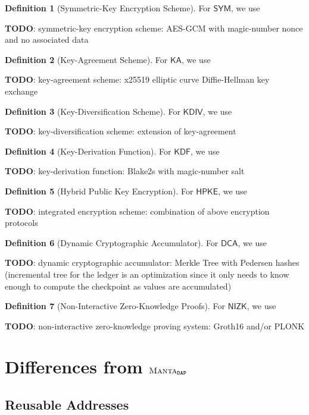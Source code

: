 \documentclass[a4paper]{article}
\newcommand{\lsection}[2]{\def\sectionlabel{#2} \section{#1}\label{sec:#2}}
\newcommand{\TODO}[1]{{\color{red}\textbf{TODO}}: #1}
\theoremstyle{definition}
\newtheorem{definition}{Definition}[subsection]
\newcommand{\DCA}{{\textsf{DCA}}}
\newcommand{\HPKE}{{\textsf{HPKE}}}
\newcommand{\KA}{{\textsf{KA}}}
\newcommand{\KDF}{{\textsf{KDF}}}
\newcommand{\KDIV}{{\textsf{KDIV}}}
\newcommand{\MantaDAP}{{\Manta{}_{\texttt{DAP}}}}
\newcommand{\Manta}{{\textsc{Manta}}}
\newcommand{\NIZK}{{\textsf{NIZK}}}
\newcommand{\SYM}{{\textsf{SYM}}}
\begin{document}
\begin{definition}[Symmetric-Key Encryption Scheme]
    For $\SYM$, we use

    \TODO{symmetric-key encryption scheme: AES-GCM with magic-number nonce and no associated data}
\end{definition}

\begin{definition}[Key-Agreement Scheme]
    For $\KA$, we use

    \TODO{key-agreement scheme: x25519 elliptic curve Diffie-Hellman key exchange}
\end{definition}

\begin{definition}[Key-Diversification Scheme]
    For $\KDIV$, we use

    \TODO{key-diversification scheme: extension of key-agreement}
\end{definition}

\begin{definition}[Key-Derivation Function]
    For $\KDF$, we use

    \TODO{key-derivation function: Blake2s with magic-number salt}
\end{definition}

\begin{definition}[Hybrid Public Key Encryption]
    For $\HPKE$, we use

    \TODO{integrated encryption scheme: combination of above encryption protocols}
\end{definition}

\begin{definition}[Dynamic Cryptographic Accumulator]
    For $\DCA$, we use

    \TODO{dynamic cryptographic accumulator: Merkle Tree with Pedersen hashes (incremental tree for the ledger is an optimization since it only needs to know enough to compute the checkpoint as values are accumulated)}
\end{definition}

\begin{definition}[Non-Interactive Zero-Knowledge Proofs]
    For $\NIZK$, we use

    \TODO{non-interactive zero-knowledge proving system: Groth16 and/or PLONK}
\end{definition}

\lsection{Differences from $\MantaDAP$}{differences}

\subsection{Reusable Addresses}
\end{document}
